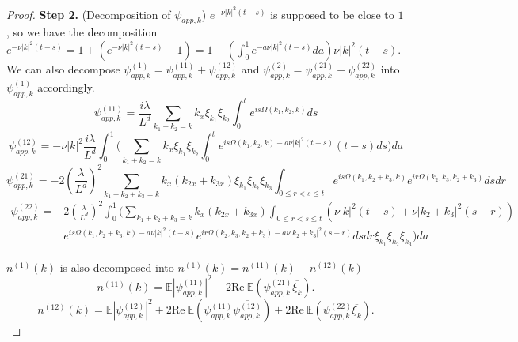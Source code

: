 \begin{proof}
\textbf{Step 2.} (Decomposition of $\psi_{app,k}$) $e^{- \nu|k|^2(t-s)}$ is supposed to be close to $1$, so we have the decomposition $e^{- \nu|k|^2(t-s)}=1+(e^{- \nu|k|^2(t-s)}-1)=1-\left(\int_{0}^1 e^{-a\nu|k|^2(t-s)} da\right) \nu|k|^2(t-s)$. We can also decompose $\psi^{(1)}_{app,k}=\psi^{(11)}_{app,k}+\psi^{(12)}_{app,k}$ and $\psi^{(2)}_{app,k}=\psi^{(21)}_{app,k}+\psi^{(22)}_{app,k}$ into $\psi^{(1)}_{app,k}$ accordingly.
\begin{equation}
    \psi^{(11)}_{app,k}=\frac{i\lambda}{L^{d}} \sum\limits_{k_1+k_2=k} k_{x}\xi_{k_1} \xi_{k_2} \int^{t}_0e^{i s\Omega(k_1,k_2,k)} ds
\end{equation}
\begin{equation}
    \psi^{(12)}_{app,k}=-\nu|k|^2\frac{i\lambda}{L^{d}} \int_{0}^1\Bigg(\sum\limits_{k_1+k_2=k} k_{x}\xi_{k_1} \xi_{k_2} \int^{t}_0e^{i s\Omega(k_1,k_2,k)- a\nu|k|^2(t-s)} (t-s)ds\Bigg) da
\end{equation}
\begin{equation}
\psi^{(21)}_{app,k}=-2\left(\frac{\lambda}{L^{d}}\right)^2 \sum\limits_{k_1+k_2+k_3=k} k_{x}(k_{2x}+k_{3x})\xi_{k_1} \xi_{k_2}\xi_{k_3}\int_{0\le r<s\le t}e^{i s\Omega(k_1,k_2+k_3,k)} e^{i r\Omega(k_2,k_3,k_2+k_3)} dsdr
\end{equation}
\begin{equation}
\begin{split}
    \psi^{(22)}_{app,k}=&2\left(\frac{\lambda}{L^{d}}\right)^2 \int_{0}^1\Bigg(\sum\limits_{k_1+k_2+k_3=k} k_{x}(k_{2x}+k_{3x})\int_{0\le r<s\le t}(\nu|k|^2(t-s)+\nu|k_2+k_3|^2(s-r))
    \\
    & e^{i s\Omega(k_1,k_2+k_3,k)- a\nu|k|^2(t-s)} e^{i r\Omega(k_2,k_3,k_2+k_3)- a\nu|k_2+k_3|^2(s-r)} dsdr\xi_{k_1}\xi_{k_2}\xi_{k_3}\Bigg)da
\end{split}
\end{equation}

$n^{(1)}(k)$ is also decomposed into $n^{(1)}(k)=n^{(11)}(k)+n^{(12)}(k)$
\begin{equation}\label{eq.n(11)}
    n^{(11)}(k)=\mathbb E \left|\psi^{(11)}_{app,k}\right|^2+ 2\text{Re}\  \mathbb E \left(\psi^{(21)}_{app,k}\overline{\xi_k}\right).
\end{equation}
\begin{equation}
    n^{(12)}(k)=\mathbb E \left|\psi^{(12)}_{app,k}\right|^2+2\text{Re}\ \mathbb E \left(\psi^{(11)}_{app,k}\overline{\psi^{(12)}_{app,k}}\right)+ 2\text{Re}\  \mathbb E \left(\psi^{(22)}_{app,k}\overline{\xi_k}\right).
\end{equation}


\end{proof}
